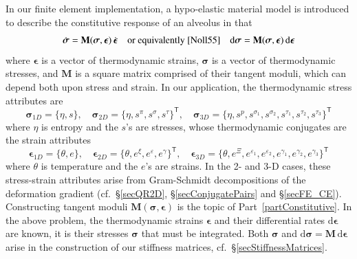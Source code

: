 In our finite element implementation, a hypo-elastic material model \cite{Truesdell55} is introduced to describe the constitutive response of an alveolus in that
\begin{displaymath}
    \dot{\boldsymbol{\sigma}} = \mathbf{M} ( \boldsymbol{\sigma} , \boldsymbol{\epsilon} ) \, \dot{\boldsymbol{\epsilon}} 
    \quad \text{or equivalently \cite{Noll55}} \quad
    \mathrm{d} \boldsymbol{\sigma} = \mathbf{M} ( \boldsymbol{\sigma} , \boldsymbol{\epsilon} ) \, \mathrm{d} \boldsymbol{\epsilon}
\end{displaymath} 
where $\boldsymbol{\epsilon}$ is a vector of thermo\-dynamic strains, $\boldsymbol{\sigma}$ is a vector of thermo\-dynamic stresses, and $\mathbf{M}$ is a square matrix comprised of their tangent moduli, which can depend both upon stress and strain.  In our application, the thermo\-dynamic stress attributes are 
\begin{displaymath}
   \boldsymbol{\sigma}_{1D} = \{ \eta , s \} , \quad
   \boldsymbol{\sigma}_{2D} = \{ \eta , s^{\pi} , s^{\sigma} , s^{\tau} \}^{\mathsf{T}} , \quad
   \boldsymbol{\sigma}_{3D} = \{ \eta , s^{p} , s^{\sigma_1} , s^{\sigma_2} , s^{\tau_1} , s^{\tau_2} , s^{\tau_3} \}^{\mathsf{T}}
\end{displaymath}
where $\eta$ is entropy and the $s$'s are stresses, whose thermo\-dynamic conjugates are the strain attributes
\begin{displaymath}
\boldsymbol{\epsilon}_{1D} = \{ \theta , e \} , \quad
\boldsymbol{\epsilon}_{2D} = \{ \theta , e^{\xi} , e^{\varepsilon} , e^{\gamma} \}^{\mathsf{T}} , \quad
\boldsymbol{\epsilon}_{3D} = \{ \theta , e^{\Xi} , e^{\varepsilon_1} , e^{\varepsilon_2} , e^{\gamma_1} , e^{\gamma_2} , e^{\gamma_3} \}^{\mathsf{T}}
\end{displaymath}
where $\theta$ is temperature and the $e$'s are strains.  In the 2- and 3-D cases, these stress-strain attributes arise from Gram-Schmidt decompositions of the deformation gradient (cf.\ \S\ref{secQR2D}, \S\ref{secConjugatePairs} and \S\ref{secFE_CE}).  Constructing tangent moduli $\mathbf{M} ( \boldsymbol{\sigma} , \boldsymbol{\epsilon} )$ is the topic of Part~\ref{partConstitutive}.  In the above problem, the thermo\-dynamic strains $\boldsymbol{\epsilon}$ and their differential rates $\mathrm{d} \boldsymbol{\epsilon}$ are known, it is their stresses $\boldsymbol{\sigma}$ that must be integrated.  Both $\boldsymbol{\sigma}$ and $\mathrm{d} \boldsymbol{\sigma} = \mathbf{M} \, \mathrm{d} \boldsymbol{\epsilon}$ arise in the construction of our stiffness matrices, cf.\ \S\ref{secStiffnessMatrices}.

